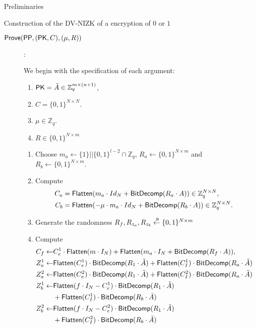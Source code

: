 \begin{section}{Preliminaries}
\begin{subsection}{Construction of the DV-NIZK of a encryption of $0$ or $1$}
\begin{description}
      \item[${\mathsf{Prove}}({\mathsf{PP}}, (\mathsf{PK}, C), (\mu, R))$]:

        We begin with the specification of each argument:
        \begin{enumerate}
        \item $\mathsf{PK} = \tilde{A} \in\mathbb{Z}_q^{m \times (n+1)}$,
        \item $C = \{0,1\}^{N \times N}$.
        \item $\mu \in \mathbb{Z}_q$.
        \item $R \in \{0,1\}^{N \times m}$
        \end{enumerate}

        \begin{enumerate}
        \item Choose $m_a \gets \{1\}||\{0,1\}^{l-2} \cap \mathbb{Z}_q$, $R_a \gets \{0,1\}^{N \times m}$ and $R_b \gets \{0,1\}^{N \times m}$.
        \item Compute
          \begin{align*}
            C_a  &= {\mathsf{Flatten}}(m_a \cdot Id_{N} + {\mathsf{BitDecomp}}(R_a \cdot A)) \in \mathbb{Z}_q^{N \times N}, \\
            C_b  &= {\mathsf{Flatten}}(-\mu \cdot m_a \cdot Id_{N} + {\mathsf{BitDecomp}}(R_b \cdot A)) \in \mathbb{Z}_q^{N \times N}.
          \end{align*}

        \item Generate the randomness $R_f, R_{z_a}, R_{z_b} \stackrel{{\scriptscriptstyle \mkern4mu R}}{\gets} \{0,1\}^{N \times m}$

        \item Compute 
          \begin{align*}
            C_f \gets& C_e^1 \cdot  {\mathsf{Flatten}}(m \cdot I_N) + {\mathsf{Flatten}}(m_a \cdot I_N + {\mathsf{BitDecomp}}(R_f \cdot A)), \\
            Z_a^1 \gets& {\mathsf{Flatten}}(C_e^1) \cdot {\mathsf{BitDecomp}}(R_1 \cdot \tilde{A}) + {\mathsf{Flatten}}(C_I^1) \cdot {\mathsf{BitDecomp}}(R_a \cdot \tilde{A})\\
            Z_a^2 \gets& {\mathsf{Flatten}}(C_e^2) \cdot {\mathsf{BitDecomp}}(R_1 \cdot \tilde{A}) + {\mathsf{Flatten}}(C_I^2) \cdot {\mathsf{BitDecomp}}(R_a \cdot \tilde{A})\\
            Z_b^1 \gets& {\mathsf{Flatten}}(f \cdot I_N - C_e^1) \cdot {\mathsf{BitDecomp}}(R_1 \cdot \tilde{A}) \\
                     & + {\mathsf{Flatten}}(C_I^1) \cdot {\mathsf{BitDecomp}}(R_b \cdot \tilde{A})\\
            Z_b^2 \gets& {\mathsf{Flatten}}(f \cdot I_N - C_e^2) \cdot {\mathsf{BitDecomp}}(R_1 \cdot \tilde{A}) \\
                     & + {\mathsf{Flatten}}(C_I^2) \cdot {\mathsf{BitDecomp}}(R_b \cdot \tilde{A})
          \end{align*}
          

\end{enumerate}
\end{description}
\end{subsection}
\end{section}
